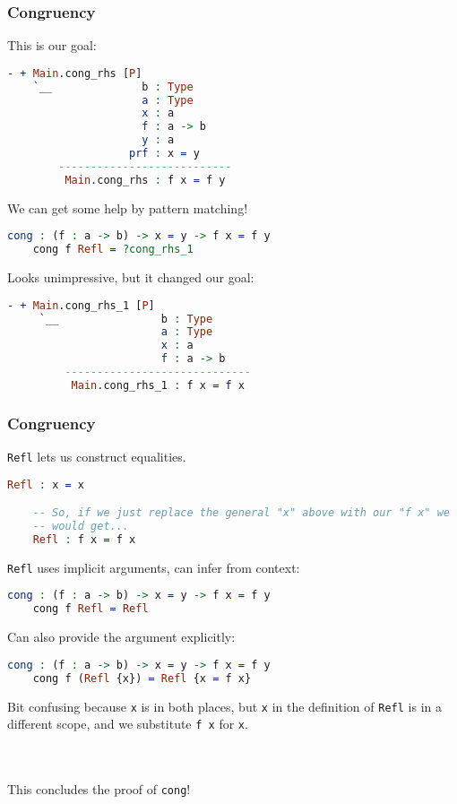 \documentclass{beamer}
\begin{document}
\begin{frame}[fragile]
  \frametitle{Congruency}

  This is our goal:

  \begin{lstlisting}[language=Idris]
     - + Main.cong_rhs [P]
    `__              b : Type
                     a : Type
                     x : a
                     f : a -> b
                     y : a
                   prf : x = y
        ---------------------------
         Main.cong_rhs : f x = f y
  \end{lstlisting}

  \pause
  We can get some help by pattern matching!

  \begin{lstlisting}[language=Idris]
    cong : (f : a -> b) -> x = y -> f x = f y
    cong f Refl = ?cong_rhs_1
  \end{lstlisting}

  \pause
  Looks unimpressive, but it changed our goal:

  \begin{lstlisting}[language=Idris]
    - + Main.cong_rhs_1 [P]
     `__                b : Type
                        a : Type
                        x : a
                        f : a -> b
         -----------------------------
          Main.cong_rhs_1 : f x = f x
  \end{lstlisting}
\end{frame}

\begin{frame}[fragile]
  \frametitle{Congruency}

  \texttt{Refl} lets us construct equalities.

  \begin{lstlisting}[language=Idris]
    Refl : x = x

    -- So, if we just replace the general "x" above with our "f x" we
    -- would get...
    Refl : f x = f x
  \end{lstlisting}

  \pause
  \texttt{Refl} uses implicit arguments, can infer from context:

  \begin{lstlisting}[language=Idris]
    cong : (f : a -> b) -> x = y -> f x = f y
    cong f Refl = Refl
  \end{lstlisting}

  \pause
  Can also provide the argument explicitly:

  \begin{lstlisting}[language=Idris]
    cong : (f : a -> b) -> x = y -> f x = f y
    cong f (Refl {x}) = Refl {x = f x}
  \end{lstlisting}

  \pause
  Bit confusing because \texttt{x} is in both places, but \texttt{x}
  in the definition of \texttt{Refl} is in a different scope, and we
  substitute \texttt{f x} for \texttt{x}.

  \pause \\~\\

  This concludes the proof of \texttt{cong}!
\end{frame}
\end{document}
